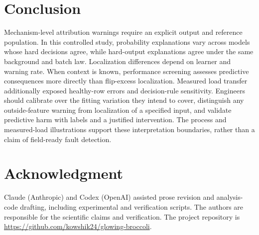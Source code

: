 \documentclass[conference]{IEEEtran}
\begin{document}
\section{Conclusion}
\label{sec:conclusion}
Mechanism-level attribution warnings require an explicit output and reference population. In this controlled study, probability explanations vary across models whose hard decisions agree, while hard-output explanations agree under the same background and batch law. Localization differences depend on learner and warning rate. When context is known, performance screening assesses predictive consequences more directly than flip-excess localization. Measured load transfer additionally exposed healthy-row errors and decision-rule sensitivity. Engineers should calibrate over the fitting variation they intend to cover, distinguish any outside-feature warning from localization of a specified input, and validate predictive harm with labels and a justified intervention. The process and measured-load illustrations support these interpretation boundaries, rather than a claim of field-ready fault detection.

\section*{Acknowledgment}
Claude (Anthropic) and Codex (OpenAI) assisted prose revision and analysis-code drafting, including experimental and verification scripts. The authors are responsible for the scientific claims and verification. The project repository is \url{https://github.com/kowshik24/glowing-broccoli}.


\end{document}
